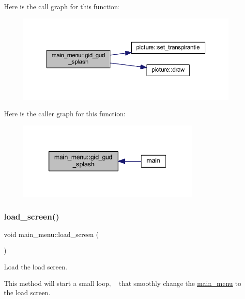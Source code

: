 Here is the call graph for this function\+:
\nopagebreak
\begin{figure}[H]
\begin{center}
\leavevmode
\includegraphics[width=347pt]{classmain__menu_a555c4191cafced116939b5c6c354fe3e_cgraph}
\end{center}
\end{figure}
Here is the caller graph for this function\+:
\nopagebreak
\begin{figure}[H]
\begin{center}
\leavevmode
\includegraphics[width=261pt]{classmain__menu_a555c4191cafced116939b5c6c354fe3e_icgraph}
\end{center}
\end{figure}
\mbox{\label{classmain__menu_a924f8d3f2d87b382a8590055cda2f549}} 
\subsubsection{\texorpdfstring{load\+\_\+screen()}{load\_screen()}}
{\footnotesize\ttfamily void main\+\_\+menu\+::load\+\_\+screen (\begin{DoxyParamCaption}{ }\end{DoxyParamCaption})}



Load the load screen. 

This method will start a small loop, ~\newline
that smoothly change the \hyperlink{classmain__menu}{main\+\_\+menu} to the load screen. ~\newline


